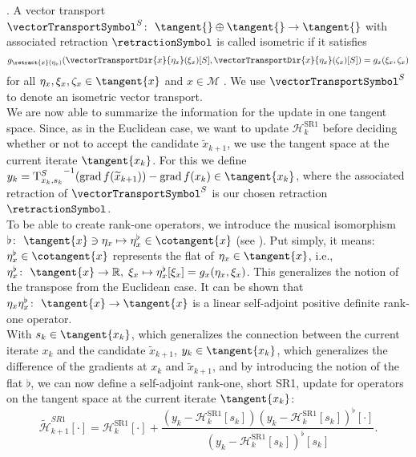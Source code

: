 \cite[Definition~8.1.1]{AbsilMahonySepulchre:2008}. A vector transport $\vectorTransportSymbol^S \colon \ \tangent{} \oplus \tangent{} \to \tangent{}$ with associated retraction $\retractionSymbol$ is called isometric if it satisfies
\begin{equation*}
    g_{\retract{x}(\eta_x)}(\vectorTransportDir{x}{\eta_x}(\xi_x)[S], \vectorTransportDir{x}{\eta_x}(\zeta_x)[S]) = g_x (\xi_x, \zeta_x)
\end{equation*}
for all $\eta_x, \xi_x, \zeta_x \in \tangent{x}$ and $x \in \mathcal{M}$ \cite[p.~10]{Huang:2013}. We use $\vectorTransportSymbol^S$ to denote an isometric vector transport. \\
We are now able to summarize the information for the update in one tangent space. Since, as in the Euclidean case, we want to update $\mathcal{H}^\mathrm{SR1}_k$ before deciding whether or not to accept the candidate $\widetilde{x}_{k+1}$, we use the tangent space at the current iterate $\tangent{x_k}$. For this we define $y_k = {\mathrm{T}^{S}_{x_k, s_k}}^{-1} ( \operatorname{grad}f(\widetilde{x}_{k+1}) ) - \operatorname{grad}f(x_k) \in \tangent{x_k}$, where the associated retraction of $\vectorTransportSymbol^S$ is our chosen retraction $\retractionSymbol$. \\
To be able to create rank-one operators, we introduce the musical isomorphism $\flat \colon \ \tangent{x} \ni \eta_{x} \mapsto \eta^{\flat}_{x} \in \cotangent{x}$ (see \cite[p.~6]{BergmannHerzogLouzeiroSilvaTenbrinckVidalNunez:2020:1}). Put simply, it means: $\eta^{\flat}_{x} \in \cotangent{x}$ represents the flat of $\eta_{x} \in \tangent{x}$, i.e., $\eta^{\flat}_{x} \colon \ \tangent{x} \to \mathbb{R}, \; \xi_{x} \mapsto \eta^{\flat}_{x}[\xi_{x}] = g_{x} (\eta_{x}, \xi_{x})$. This generalizes the notion of the transpose from the Euclidean case. It can be shown that $\eta_{x} \eta^{\flat}_{x} \colon \ \tangent{x} \to \tangent{x}$ is a linear self-adjoint positive definite rank-one operator. \\
With $s_k \in \tangent{x_k}$, which generalizes the connection between the current iterate $x_k$ and the candidate $\widetilde{x}_{k+1}$, $y_k \in \tangent{x_k}$, which generalizes the difference of the gradients at $x_k$ and $\widetilde{x}_{k+1}$, and by introducing the notion of the flat $\flat$, we can now define a self-adjoint rank-one, short SR1, update for operators on the tangent space at the current iterate $\tangent{x_k}$:
\begin{equation}\label{RiemannianDirectSR1formula}
    \widetilde{\mathcal{H}}^{SR1}_{k+1} [\cdot] = \mathcal{H}^\mathrm{SR1}_k [\cdot] + \frac{(y_k - \mathcal{H}^\mathrm{SR1}_k [s_k]) (y_k - \mathcal{H}^\mathrm{SR1}_k [s_k])^{\flat} [\cdot] }{(y_k - \mathcal{H}^\mathrm{SR1}_k [s_k])^{\flat} [s_k]}.
\end{equation}
